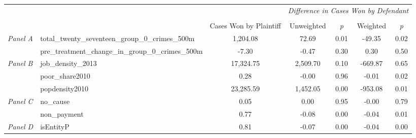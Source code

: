 \begin{tabular}{llccccc}
\toprule
 &  & \textit{} & \multicolumn{4}{c}{\textit{Difference in Cases Won by Defendant}} \\
\cline{4-7}
\\
 &  & Cases Won by Plaintiff & Unweighted & \emph{p} & Weighted & \emph{p} \\
\midrule
\multirow[c]{2}{3cm}{\textit{Panel A}} & total_twenty_seventeen_group_0_crimes_500m & 1,204.08 & 72.69 & 0.01 & -49.35 & 0.02 \\
 & pre_treatment_change_in_group_0_crimes_500m & -7.30 & -0.47 & 0.30 & 0.30 & 0.50 \\
\cline{1-7}
\multirow[c]{3}{3cm}{\textit{Panel B}} & job_density_2013 & 17,324.75 & 2,509.70 & 0.10 & -669.87 & 0.65 \\
 & poor_share2010 & 0.28 & -0.00 & 0.96 & -0.01 & 0.02 \\
 & popdensity2010 & 23,285.59 & 1,452.05 & 0.00 & -953.08 & 0.01 \\
\cline{1-7}
\multirow[c]{2}{3cm}{\textit{Panel C}} & no_cause & 0.05 & 0.00 & 0.95 & -0.00 & 0.79 \\
 & non_payment & 0.77 & -0.08 & 0.00 & -0.04 & 0.01 \\
\cline{1-7}
\textit{Panel D} & isEntityP & 0.81 & -0.07 & 0.00 & -0.04 & 0.00 \\
\cline{1-7}
\bottomrule
\end{tabular}
